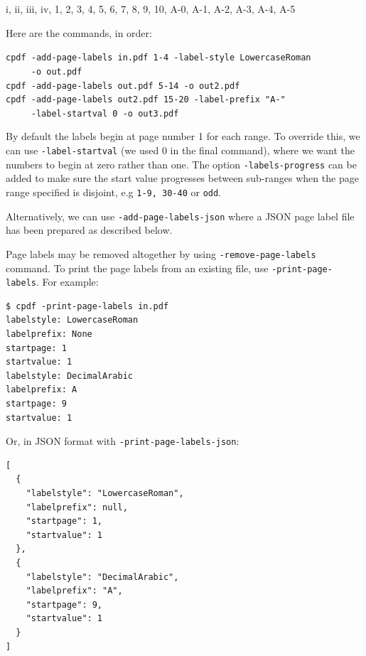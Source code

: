 \documentclass{book}
\begin{document}
\vspace{4mm}
i, ii, iii, iv, 1, 2, 3, 4, 5, 6, 7, 8, 9, 10, A-0, A-1, A-2, A-3, A-4, A-5
\vspace{4mm}

\noindent Here are the commands, in order:

{\small\begin{framed}
  \noindent\verb!cpdf -add-page-labels in.pdf 1-4 -label-style LowercaseRoman!\\
  \noindent\verb!     -o out.pdf!\\
  
  \noindent\verb!cpdf -add-page-labels out.pdf 5-14 -o out2.pdf!\\

  \noindent\verb!cpdf -add-page-labels out2.pdf 15-20 -label-prefix "A-"!\\
  \noindent\verb!     -label-startval 0 -o out3.pdf!
\end{framed}}

\noindent By default the labels begin at page number 1 for each range. To override this, we can use \texttt{-label-startval} (we used $0$ in the final command), where we want the numbers to begin at zero rather than one. The option \texttt{-labels-progress} can be added to make sure the  start value progresses between sub-ranges when the page range specified is disjoint, e.g \texttt{1-9, 30-40} or \texttt{odd}.

Alternatively, we can use \texttt{-add-page-labels-json} where a JSON page label file has been prepared as described below.

Page labels may be removed altogether by using \texttt{-remove-page-labels} command. To print the page labels from an existing file, use \texttt{-print-page-labels}. For example:

\begin{framed}\small\begin{verbatim}
$ cpdf -print-page-labels in.pdf
labelstyle: LowercaseRoman
labelprefix: None
startpage: 1
startvalue: 1
labelstyle: DecimalArabic
labelprefix: A
startpage: 9
startvalue: 1
\end{verbatim}
\end{framed}\pagestyle{empty}\thispagestyle{fancy}

\noindent Or, in JSON format with \texttt{-print-page-labels-json}:

\begin{framed}\small\begin{verbatim}
[
  {
    "labelstyle": "LowercaseRoman",
    "labelprefix": null,
    "startpage": 1,
    "startvalue": 1
  },
  {
    "labelstyle": "DecimalArabic",
    "labelprefix": "A",
    "startpage": 9,
    "startvalue": 1
  }
]
\end{verbatim}

\end{framed}
\end{document}
